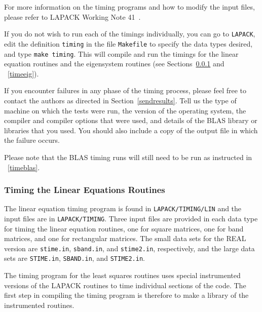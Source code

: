 \documentclass[11pt]{report}
\begin{document}
For more information on the timing programs and how to modify the
input files, please refer to LAPACK Working Note 41~\cite{WN41}.

If you do not wish to run each of the timings individually, you can
go to \texttt{LAPACK}, edit the definition \texttt{timing} in the file
\texttt{Makefile} to specify the data types desired, and type \texttt{make
timing}.  This will compile
and run the timings for the linear equation routines and the eigensystem
routines (see Sections~\ref{timelin} and ~\ref{timeeig}). 


If you encounter failures in any phase of the timing process, please
feel free to contact the authors as directed in Section~\ref{sendresults}.
Tell us the 
type of machine on which the tests were run, the version of the operating
system, the compiler and compiler options that were used,
and details of the BLAS library or libraries that you used.  You should
also include a copy of the output file in which the failure occurs.

Please note that the BLAS
timing runs will still need to be run as instructed in ~\ref{timeblas}.

\subsubsection{Timing the Linear Equations Routines}\label{timelin}

The linear equation timing program is found in \texttt{LAPACK/TIMING/LIN}
and the input files are in \texttt{LAPACK/TIMING}.
Three input files are provided in each data type for timing the
linear equation routines, one for square matrices, one for band
matrices, and one for rectangular matrices.  The small data sets for the REAL version
are \texttt{stime.in}, \texttt{sband.in}, and \texttt{stime2.in}, respectively,
and the large data sets are
\texttt{STIME.in}, \texttt{SBAND.in}, and \texttt{STIME2.in}.

The timing program for the least squares routines uses special instrumented
versions of the LAPACK routines to time individual sections of the code.
The first step in compiling the timing program is therefore to make a library
of the instrumented routines.
\end{document}
